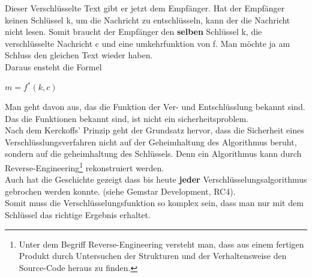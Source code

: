 Dieser Verschlüsselte Text gibt er jetzt dem Empfänger. Hat der Empfänger keinen Schlüssel k, um die Nachricht zu entschlüsseln, kann der die Nachricht nicht lesen. Somit braucht der Empfänger den \textbf{selben} Schlüssel k, die verschlüsselte Nachricht c und eine umkehrfunktion von f. Man möchte ja am Schluss den gleichen Text wieder haben.\\
Daraus ensteht die Formel 
 \begin{center}
$m = f^*(k,c)$
 \end{center}
Man geht davon aus, das die Funktion der Ver- und Entschlüsslung bekannt sind. Das die Funktionen bekannt sind, ist nicht ein sicherheitsproblem.\\
Nach dem Kerckoffs' Prinzip geht der Grundsatz hervor, dass die Sicherheit eines Verschlüsslungsverfahren nicht auf der Geheimhaltung des Algorithmus beruht, sondern auf die geheimhaltung des Schlüssels.
Denn ein Algorithmus kann durch Reverse-Engineering\footnote{Unter dem Begriff Reverse-Engineering versteht man, dass aus einem fertigen Produkt durch Untersuchen der Strukturen und der Verhaltensweise den Source-Code heraus zu finden.} rekonstruiert werden.\\
Auch hat die Geschichte gezeigt dass bis heute \textbf{jeder} Verschlüsselungsalgorithmus gebrochen werden konnte. (siehe Gemstar Development, RC4).\\[2ex]
%
Somit muss die Verschlüsselungsfunktion so komplex sein, dass man nur mit dem Schlüssel das richtige Ergebnis erhaltet.
%
